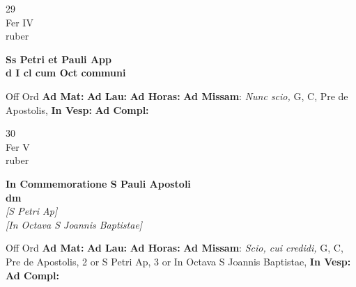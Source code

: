 \documentclass[10pt, openany]{book}
\begin{document}
        \begin{center}
            \begin{minipage}{3.5in}
                \vspace{2em}
                \begin{minipage}{0.5in}
                    {\Huge 29} \\
                    {\normalsize Fer IV} \\
                    {\normalsize ruber}
                \end{minipage}
                \begin{minipage}{3.0in}
                    \textbf{ \large Ss Petri et Pauli App \\
                    \textnormal{\normalsize d I cl cum Oct communi}} \\ 
                \end{minipage}
                \begin{justify}Off Ord
                    \textbf{Ad Mat: }
                    \textbf{Ad Lau: }
                    \textbf{Ad Horas: }\textbf{Ad Missam}: \textit{Nunc scio,} G, C, Pre de Apostolis,  
                    \textbf{In Vesp: }
                    \textbf{Ad Compl: }
                \end{justify}
            \end{minipage}
        \end{center}
    
        \begin{center}
            \begin{minipage}{3.5in}
                \vspace{2em}
                \begin{minipage}{0.5in}
                    {\Huge 30} \\
                    {\normalsize Fer V} \\
                    {\normalsize ruber}
                \end{minipage}
                \begin{minipage}{3.0in}
                    \textbf{ \large In Commemoratione S Pauli Apostoli \\
                    \textnormal{\normalsize dm}} \\ \textit{[S Petri Ap]} \\ \textit{[In Octava S Joannis Baptistae]} \\ 
                \end{minipage}
                \begin{justify}Off Ord
                    \textbf{Ad Mat: }
                    \textbf{Ad Lau: }
                    \textbf{Ad Horas: }\textbf{Ad Missam}: \textit{Scio, cui credidi,} G, C, Pre de Apostolis, 2 or S Petri Ap, 3 or In Octava S Joannis Baptistae,  
                    \textbf{In Vesp: }
                    \textbf{Ad Compl: }
                \end{justify}
            \end{minipage}
        \end{center}
    
\end{document}

